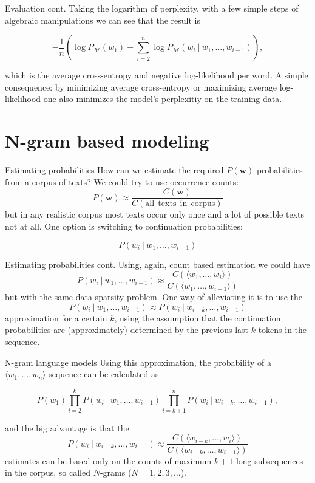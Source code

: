 \documentclass[style=upen, size=14pt]{powerdot}
\theoremstyle{definition}
\begin{document}
\begin{slide}[toc=]{Evaluation cont.}
  Taking the logarithm of perplexity, with a few simple steps of algebraic
  manipulations we can see that the result is

  $$
  - \frac{1}{n} \left(\log P_{\mathcal M}(w_1) + \sum_{i=2}^n\log P_{\mathcal M}(w_i ~\vert~ w_1,\dots, w_{i-1})\right),
$$

which is the average cross-entropy and negative log-likelihood per word. A
simple consequence: by minimizing average cross-entropy or maximizing average
log-likelihood one also minimizes the model's perplexitiy on the training data.
\end{slide}

\section{N-gram based modeling}

\begin{slide}[toc=Estimating probabilities]{Estimating  probabilities}
  How can we estimate the required $P(\mathbf{w})$ probabilities from a corpus
  of texts? We could try to use occurrence counts:
  $$
  P(\mathbf{w}) \approx \frac{C(\mathbf{w})}{C(\mathrm{all~~texts~~in~~corpus})}
  $$
  but in any realistic corpus most texts occur only once and a lot of possible
  texts not at all. One option is switching to continuation probabilities: 
  
  $$
  P(w_{i} ~\vert~ w_1,\dots,w_{i-1})
  $$
\end{slide}

\begin{slide}[toc=]{Estimating  probabilities cont.}
  Using, again, count based estimation we could have
  $$
  P(w_{i} ~\vert~ w_1,\dots,w_{i-1}) \approx
  \frac{C(\langle w_1,\dots,w_{i} \rangle)}{C(\langle w_1,\dots,w_{i-1} \rangle
    )}
  $$
  but with the same data sparsity problem. One way of alleviating it is to use
  the
  $$
  P(w_{i} ~\vert~ w_1,\dots,w_{i-1}) \approx P(w_{i} ~\vert~
  w_{i-k},\dots,w_{i-1})
  $$
  approximation for a certain $k$, using the assumption that the continuation
  probabilities are (approximately) determined by the previous last $k$ tokens
  in the sequence.
\end{slide}

\begin{slide}[toc=N-grams]{N-gram language models}
  Using this approximation, the probability of a $\langle w_1,\dots,w_n \rangle$
  sequence can be calculated as
  \begin{small}
  $$
  P(w_1) \prod_{i=2}^k P(w_{i} ~\vert~ w_{1},\dots,w_{i-1})  \prod_{i=k+1}^n P(w_{i} ~\vert~ w_{i-k},\dots,w_{i-1}),
  $$
\end{small}
and the big advantage is that the
  $$
  P(w_{i} ~\vert~ w_{i-k},\dots,w_{i-1}) \approx
\frac{C(\langle w_{i-k},\dots,w_{i}\rangle)}{C(\langle w_{i-k},\dots,w_{i-1} \rangle)}
  $$
  estimates can be based only on the counts of maximum $k+1$ long subsequences
  in the corpus, so called $N$-grams ($N=1, 2, 3,\dots$).
\end{slide}
\end{document}

